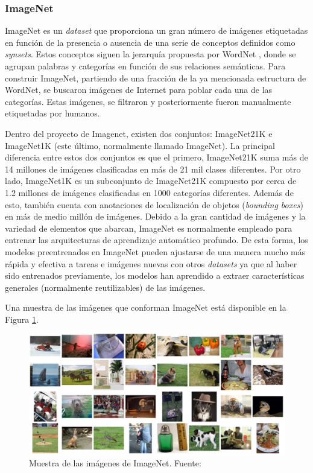\subsubsection{ImageNet}
ImageNet \cite{imagenet_cvpr09, ILSVRC15} es un \textit{dataset} que proporciona un gran número de imágenes etiquetadas en función de la presencia o ausencia de una serie de conceptos definidos como \textit{synsets}. Estos conceptos siguen la jerarquía propuesta por WordNet \cite{wordnet}, donde se agrupan palabras y categorías en función de sus relaciones semánticas. Para construir ImageNet, partiendo de una fracción de la ya mencionada estructura de WordNet, se buscaron imágenes de Internet para poblar cada una de las categorías. Estas imágenes, se filtraron y posteriormente fueron manualmente etiquetadas por humanos. 

Dentro del proyecto de Imagenet, existen dos conjuntos: ImageNet21K e ImageNet1K (este último, normalmente llamado ImageNet). La principal diferencia entre estos dos conjuntos es que el primero, ImageNet21K suma más de 14 millones de imágenes clasificadas en más de 21 mil clases diferentes. Por otro lado, ImageNet1K es un subconjunto de ImageNet21K compuesto por cerca de 1.2 millones de imágenes clasificadas en 1000 categorías diferentes. Además de esto, también cuenta con anotaciones de localización de objetos (\textit{bounding boxes}) en más de medio millón de imágenes. Debido a la gran cantidad de imágenes y la variedad de elementos que abarcan, ImageNet es normalmente empleado para entrenar las arquitecturas de aprendizaje automático profundo. De esta forma, los modelos preentrenados en ImageNet pueden ajustarse de una manera mucho más rápida y efectiva a tareas e imágenes nuevas con otros \textit{datasets} ya que al haber sido entrenados previamente, los modelos han aprendido a extraer características generales (normalmente reutilizables) de las imágenes.

Una muestra de las imágenes que conforman ImageNet está disponible en la Figura \ref{fig:imagenet}.
\begin{figure}[H]
\centering
\includegraphics[width=\textwidth]{imagenes/imagenet.png}
\caption{Muestra de las imágenes de ImageNet. Fuente: \cite{ILSVRC15}}
\label{fig:imagenet}
\end{figure}

